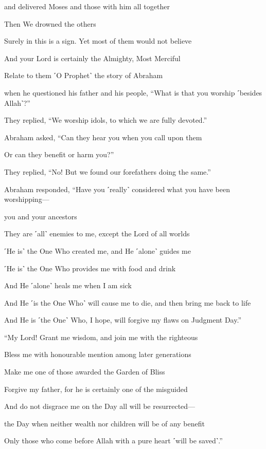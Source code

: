 and delivered Moses and those with him all together

Then We drowned the others

Surely in this is a sign. Yet most of them would not believe

And your Lord is certainly the Almighty, Most Merciful

Relate to them ˹O Prophet˺ the story of Abraham

when he questioned his father and his people, “What is that you worship ˹besides Allah˺?”

They replied, “We worship idols, to which we are fully devoted.”

Abraham asked, “Can they hear you when you call upon them

Or can they benefit or harm you?”

They replied, “No! But we found our forefathers doing the same.”

Abraham responded, “Have you ˹really˺ considered what you have been worshipping—

you and your ancestors

They are ˹all˺ enemies to me, except the Lord of all worlds

˹He is˺ the One Who created me, and He ˹alone˺ guides me

˹He is˺ the One Who provides me with food and drink

And He ˹alone˺ heals me when I am sick

And He ˹is the One Who˺ will cause me to die, and then bring me back to life

And He is ˹the One˺ Who, I hope, will forgive my flaws on Judgment Day.”

“My Lord! Grant me wisdom, and join me with the righteous

Bless me with honourable mention among later generations

Make me one of those awarded the Garden of Bliss

Forgive my father, for he is certainly one of the misguided

And do not disgrace me on the Day all will be resurrected—

the Day when neither wealth nor children will be of any benefit

Only those who come before Allah with a pure heart ˹will be saved˺.”

